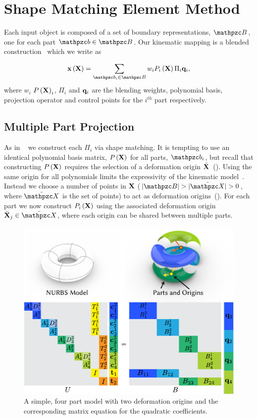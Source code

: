 \section{Shape Matching Element Method}
 Each input object is composed of a set of boundary representations, $\Prts$, one for each part $\prt\in\Prts$. 
 Our kinematic mapping is a blended construction~\cite{10.1145/2614028.2615427,blendedFORKS2016} which we write as

 \begin{equation}
    \defX\left(\refX\right) = \sum_{\prt_i\in\Prts} \bld_i\Pmatxi\Pi_i\vc{q}_i, 
    \label{eq:kinematics}
 \end{equation} where $w_i$ $P\left(\mathbf{X}\right)_i$, $\Pi_i$ and $\mathbf{q}_i$ are the blending weights, polynomial basis, projection operator and control points for the $i^{th}$
 part respectively.  
 
 \subsection*{Multiple Part Projection}
As in ~ we construct each $\Pi_i$ via shape matching. 
It is tempting to use an identical polynomial basis matrix, $P\left(\mathbf{X}\right)$ for all parts, $\prt_i$, but recall that constructing $P\left(\mathbf{X}\right)$ requires the selection of a deformation
origin $\bar{\mathbf{X}}$~(). 
Using the same origin for all polynomials limits the expressivity of the kinematic model~\cite{STBS:2011}.
Instead we choose a number of points in $\mathbf{X}$ ($|\Prts| > |\XBs| > 0$, where $\XBs$ is the set of points)  to act as deformation origins~().
For each part we now construct $P_i\left(\mathbf{X} \right)$ using the associated deformation origin $\bar{\refX}_j\in \XBs$, where each origin can
be shared between multiple parts.

\begin{figure}[h]
    \includegraphics[width=\columnwidth]{figures/projection_operator_solve}
    \caption{A simple, four part model with two deformation origins and the corresponding matrix equation for the quadratic coefficients.}
    \label{fig:multiparts}
\end{figure}


